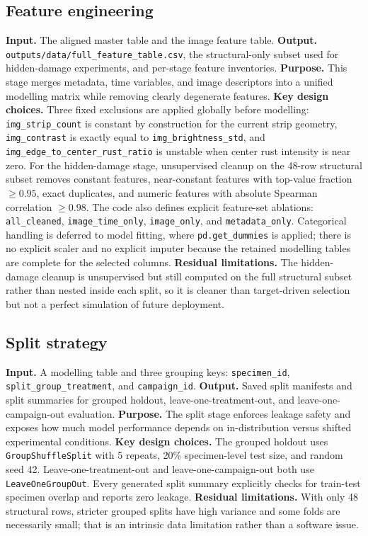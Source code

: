 \documentclass[10pt,a4paper,twocolumn]{article}
\begin{document}
\subsection{Feature engineering}

\textbf{Input.} The aligned master table and the image feature table. \textbf{Output.} \texttt{outputs/data/full\_feature\_table.csv}, the structural-only subset used for hidden-damage experiments, and per-stage feature inventories. \textbf{Purpose.} This stage merges metadata, time variables, and image descriptors into a unified modelling matrix while removing clearly degenerate features. \textbf{Key design choices.} Three fixed exclusions are applied globally before modelling: \texttt{img\_strip\_count} is constant by construction for the current strip geometry, \texttt{img\_contrast} is exactly equal to \texttt{img\_brightness\_std}, and \texttt{img\_edge\_to\_center\_rust\_ratio} is unstable when center rust intensity is near zero. For the hidden-damage stage, unsupervised cleanup on the 48-row structural subset removes constant features, near-constant features with top-value fraction $\ge 0.95$, exact duplicates, and numeric features with absolute Spearman correlation $\ge 0.98$. The code also defines explicit feature-set ablations: \texttt{all\_cleaned}, \texttt{image\_time\_only}, \texttt{image\_only}, and \texttt{metadata\_only}. Categorical handling is deferred to model fitting, where \texttt{pd.get\_dummies} is applied; there is no explicit scaler and no explicit imputer because the retained modelling tables are complete for the selected columns. \textbf{Residual limitations.} The hidden-damage cleanup is unsupervised but still computed on the full structural subset rather than nested inside each split, so it is cleaner than target-driven selection but not a perfect simulation of future deployment.

\subsection{Split strategy}

\textbf{Input.} A modelling table and three grouping keys: \texttt{specimen\_id}, \texttt{split\_group\_treatment}, and \texttt{campaign\_id}. \textbf{Output.} Saved split manifests and split summaries for grouped holdout, leave-one-treatment-out, and leave-one-campaign-out evaluation. \textbf{Purpose.} The split stage enforces leakage safety and exposes how much model performance depends on in-distribution versus shifted experimental conditions. \textbf{Key design choices.} The grouped holdout uses \texttt{GroupShuffleSplit} with 5 repeats, 20\% specimen-level test size, and random seed 42. Leave-one-treatment-out and leave-one-campaign-out both use \texttt{LeaveOneGroupOut}. Every generated split summary explicitly checks for train-test specimen overlap and reports zero leakage. \textbf{Residual limitations.} With only 48 structural rows, stricter grouped splits have high variance and some folds are necessarily small; that is an intrinsic data limitation rather than a software issue.
\end{document}
